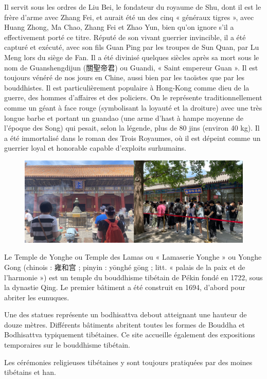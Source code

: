 \begin{Ex}[Guan Yu ]
Il servit sous les ordres de Liu Bei, le fondateur du royaume de Shu, dont il est le frère d'arme avec Zhang Fei, et aurait été un des cinq « généraux tigres », avec Huang Zhong, Ma Chao, Zhang Fei et Zhao Yun, bien qu’on ignore s’il a effectivement porté ce titre. Réputé de son vivant guerrier invincible, il a été capturé et exécuté, avec son fils Guan Ping par les troupes de Sun Quan, par Lu Meng lors du siège de Fan. Il a été divinisé quelques siècles après sa mort sous le nom de Guanshengdijun (關聖帝君) ou Guandi, « Saint empereur Guan ». Il est toujours vénéré de nos jours en Chine, aussi bien par les taoïstes que par les bouddhistes. Il est particulièrement populaire à Hong-Kong comme dieu de la guerre, des hommes d’affaires et des policiers. On le représente traditionnellement comme un géant à face rouge (symbolisant la loyauté et la droiture) avec une très longue barbe et portant un guandao (une arme d’hast à hampe moyenne de l’époque des Song) qui pesait, selon la légende, plus de 80 jins (environ 40 kg). Il a été immortalisé dans le roman des Trois Royaumes, où il est dépeint comme un guerrier loyal et honorable capable d'exploits surhumains.
\end{Ex}

\begin{Ex}
        \begin{figure}[!h]
        \centering
                \includegraphics[width=1\textwidth]{ConfucianismeTaoismeBouddhismeChinois/Images/TempleLamaYonghe.png}
            

        \label{fig:enter-label}
    \end{figure}
    Le Temple de Yonghe ou Temple des Lamas ou « Lamaserie Yonghe » ou Yonghe Gong (chinois : 雍和宫 ; pinyin : yōnghé gōng ; litt. « palais de la paix et de l'harmonie ») est un temple du bouddhisme tibétain de Pékin fondé en 1722, sous la dynastie Qing. Le premier bâtiment a été construit en 1694, d'abord pour abriter les eunuques.

Une des statues représente un bodhisattva debout atteignant une hauteur de douze mètres. Différents bâtiments abritent toutes les formes de Bouddha et Bodhisattva typiquement tibétaines. Ce site accueille également des expositions temporaires sur le bouddhisme tibétain.

Les cérémonies religieuses tibétaines y sont toujours pratiquées par des moines tibétains et han.
\end{Ex}

